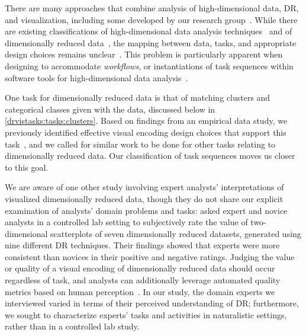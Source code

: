 \begin{sloppypar}
There are many approaches that combine analysis of high-dimensional data, \ac{DR}, and visualization, including some developed by our research group~\cite{Ingram2010,Ingram2009,Williams2004}.
While there are existing classifications of high-dimensional data analysis techniques~\cite{Bertini2011} and of dimensionally reduced data~\cite{Sedlmair2012a}, the mapping between data, tasks, and appropriate design choices remains unclear~\cite{Tatu2010a}. 
This problem is particularly apparent when designing to accommodate {\it workflows}, or instantiations of task sequences within software tools for high-dimensional data analysis~\cite{Ingram2010,Johansson2009}.
\end{sloppypar}

One task for dimensionally reduced data is that of matching clusters and categorical classes given with the data, discussed below in \autoref{drvistasks:tasks:clusters}. 
Based on findings from an empirical data study, we previously identified effective visual encoding design choices that support this task~\cite{Sedlmair2013}, and we called for similar work to be done for other tasks relating to dimensionally reduced data.
Our classification of task sequences moves us closer to this goal.

We are aware of one other study involving expert analysts' interpretations of visualized dimensionally reduced data, though they do not share our explicit examination of analysts' domain problems and tasks: \citet{Lewis2012} asked expert and novice analysts in a controlled lab setting to subjectively rate the value of two-dimensional scatterplots of seven dimensionally reduced datasets, generated using nine different \ac{DR} techniques. 
Their findings showed that experts were more consistent than novices in their positive and negative ratings.
Judging the value or quality of a visual encoding of dimensionally reduced data should occur regardless of task, and analysts can additionally leverage automated quality metrics based on human perception~\cite{Albuquerque2010a,Bertini2011}. 
In our study, the domain experts we interviewed varied in terms of their perceived understanding of \ac{DR}; furthermore, we sought to characterize experts' tasks and activities in naturalistic settings, rather than in a controlled lab study.

